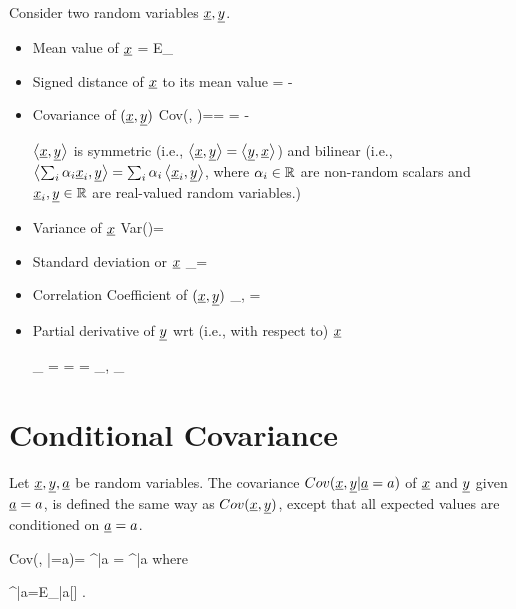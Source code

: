 Consider two random variables $\rvx, \rvy$.

\begin{itemize}
\item
Mean value of $\rvx$
\beq
\av{\rvx}=
E_\rvx[\rvx]
\eeq

\item
Signed distance of $\rvx$ to its mean value
\beq
\Delta \rvx = \rvx - \av{\rvx}
\eeq

\item
Covariance of $(\rvx, \rvy)$
\beq
Cov(\rvx, \rvy)=\av{\rvx, \rvy}=
\av{\Delta \rvx \Delta \rvy}
=
\av{\rvx\rvy}-\av{\rvx}\av{\rvy}
\eeq

$\av{\rvx, \rvy}$ is symmetric
(i.e., $\av{\rvx, \rvy}=\av{\rvy, \rvx}$)
and bilinear (i.e.,
$\av{\sum_i \alp_i\rvx_i, \rvy}
=
\sum_i\alp_i\av{\rvx_i, \rvy}$, where
$\alpha_i\in { \mathbb{R}}$
are non-random scalars
and $\rvx_i, \rvy\in\RR$ are
real-valued random
variables.)

\item
Variance of $\rvx$
\beq
Var(\rvx)=\av{\rvx, \rvx}
\eeq

\item
Standard deviation or $\rvx$
\beq
\sigma_\rvx=\sqrt{\av{\rvx, \rvx}}
\eeq

\item
Correlation Coefficient of $(\rvx, \rvy)$
\beq
\rho_{\rvx, \rvy}=
\frac{\av{\rvx, \rvy}}
{\sqrt{\av{\rvx, \rvx}\av{\rvy, \rvy}}}
\eeq

\item Partial derivative of $\rvy$
wrt (i.e., with respect to) $\rvx$

\beq
\partial_\rvx\rvy
=
\pder{\rvy}{\rvx}
=
\frac{\av{\rvx,\rvy}}
{\av{\rvx, \rvx}}
=
\rho_{\rvx, \rvy}\frac{
\s_\rvy}
{\s_\rvx}
\eeq
\end{itemize}


\section{Conditional Covariance}
\label{sec-cond-cov}
Let $\rvx, \rvy, \rva$
be random variables.
The covariance $Cov(\rvx, \rvy|\rva=a)$
of $\rvx$ and $\rvy$
given $\rva=a$, is defined
the same
way as $Cov(\rvx, \rvy)$,
except that all
expected values are
conditioned on $\rva=a$.



\beq
Cov(\rvx, \rvy|\rva=a)=
\av{\rvx, \rvy}^{|a}
=
^{|a}
\eeq
where

\beq
\av{\rvx}^{|a}=E_{\rvx|a}[\rvx]
\;.
\eeq

